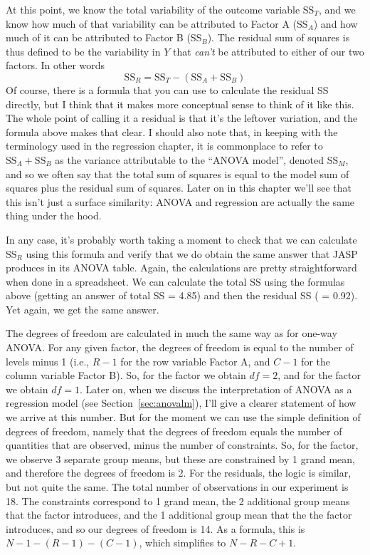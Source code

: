 \begin{mdframed}[style=MyFrame,nobreak=false]
At this point, we know the total variability of the outcome variable SS$_T$, and we know how much of that variability can be attributed to Factor A (SS$_A$) and how much of it can be attributed to Factor B (SS$_B$). The residual sum of squares is thus defined to be the variability in $Y$ that {\it can't} be attributed to either of our two factors. In other words
$$
\mbox{SS}_R = \mbox{SS}_T - (\mbox{SS}_A + \mbox{SS}_B)
$$
Of course, there is a formula that you can use to calculate the residual SS directly, but I think that it makes more conceptual sense to think of it like this. The whole point of calling it a residual is that it's the leftover variation, and the formula above makes that clear. I should also note that, in keeping with the terminology used in the regression chapter, it is commonplace to refer to $\mbox{SS}_A + \mbox{SS}_B$ as the variance attributable to the ``ANOVA model'', denoted SS$_M$, and so we often say that the total sum of squares is equal to the model sum of squares plus the residual sum of squares. Later on in this chapter we'll see that this isn't just a surface similarity: ANOVA and regression are actually the same thing under the hood. 

In any case, it's probably worth taking a moment to check that we can calculate SS$_R$ using this formula and verify that we do obtain the same answer that JASP produces in its ANOVA table. Again, the calculations are pretty straightforward when done in a spreadsheet. We can calculate the total SS using the formulas above (getting an answer of total SS = 4.85) and then the residual SS ( = 0.92). Yet again, we get the same answer. 

\end{mdframed}


The degrees of freedom are calculated in much the same way as for one-way ANOVA. For any given factor, the degrees of freedom is equal to the number of levels minus 1 (i.e., $R-1$ for the row variable Factor A, and $C-1$ for the column variable Factor B). So, for the  factor we obtain $df = 2$, and for the  factor we obtain $df=1$. Later on, when we discuss the interpretation of ANOVA as a regression model (see Section~\ref{sec:anovalm}), I'll give a clearer statement of how we arrive at this number. But for the moment we can use the simple definition of degrees of freedom, namely that the degrees of freedom equals the number of quantities that are observed, minus the number of constraints. So, for the  factor, we observe 3 separate group means, but these are constrained by 1 grand mean, and therefore the degrees of freedom is 2. For the residuals, the logic is similar, but not quite the same. The total number of observations in our experiment is 18. The constraints correspond to 1 grand mean, the 2 additional group means that the  factor introduces, and the 1 additional group mean that the the  factor introduces, and so our degrees of freedom is 14. As a formula, this is $N-1 -(R-1)-(C-1)$, which simplifies to $N-R-C+1$.


